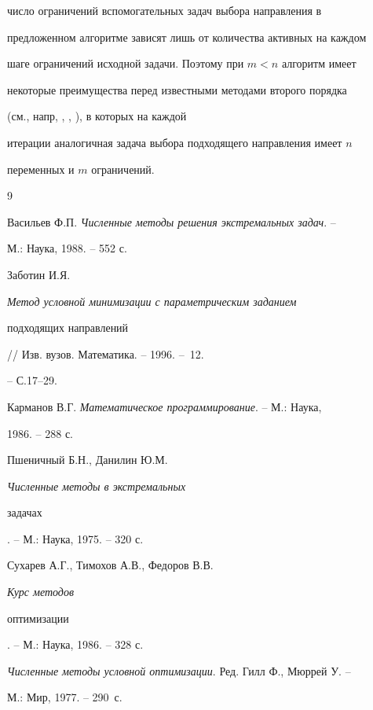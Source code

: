 число ограничений вспомогательных задач выбора направления в


предложенном алгоритме зависят лишь от количества активных на каждом


шаге ограничений исходной задачи. Поэтому при $m<n$ алгоритм имеет


некоторые преимущества перед известными методами второго порядка


(см., напр, \cite{Vas}, \cite{Ps}, \cite{Gill}), в которых на каждой


итерации аналогичная задача выбора подходящего направления имеет $n$


переменных и $m$ ограничений.





\begin{thebibliography}{9}







Васильев Ф.П. {\em Численные методы решения экстремальных задач}. --


М.: Наука, 1988. -- 552 с.




Заботин И.Я. {\em Метод условной минимизации с параметрическим заданием


подходящих направлений} // Изв. вузов. Математика. -- 1996. -- \No\,12.


-- С.17--29.




Карманов В.Г. {\em Математическое программирование}. -- М.: Наука,


1986. -- 288 с.




Пшеничный Б.Н., Данилин Ю.М. {\em Численные методы в экстремальных


задачах}. -- М.: Наука, 1975. -- 320 с.




Сухарев А.Г., Тимохов А.В., Федоров В.В. {\em Курс методов


оптимизации}. -- М.: Наука, 1986. -- 328 с.




{\em Численные методы условной оптимизации}. Ред. Гилл Ф., Мюррей У. --


М.: Мир, 1977. -- 290~с.





\end{thebibliography}





\vskip 2cm















